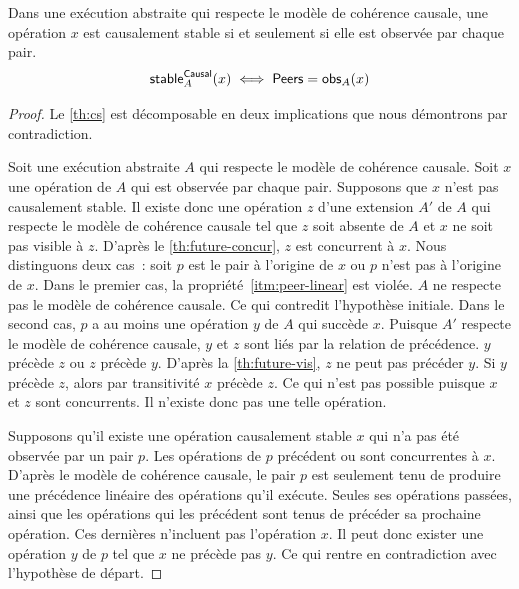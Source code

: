 \begin{theorem}\label{th:cs}
Dans une exécution abstraite qui respecte le modèle de cohérence causale, une opération $x$ est causalement stable si et seulement si elle est observée par chaque pair.
\begin{equation*}
    \operatorname{\mathsf{stable}}_A^{\operatorname{\mathsf{Causal}}}(x) \iff \operatorname{\mathsf{Peers}} = \operatorname{\mathsf{obs}}_A(x)
\end{equation*}
\end{theorem}

\begin{proof}
Le \autoref{th:cs} est décomposable en deux implications que nous démontrons par contradiction.

Soit une exécution abstraite $A$ qui respecte le modèle de cohérence causale.
Soit $x$ une opération de $A$ qui est observée par chaque pair.
Supposons que $x$ n'est pas causalement stable.
Il existe donc une opération $z$ d'une extension $A'$ de $A$ qui respecte le modèle de cohérence causale tel que $z$ soit absente de $A$ et $x$ ne soit pas visible à $z$.
D'après le \autoref{th:future-concur}, $z$ est concurrent à $x$.
Nous distinguons deux cas~: soit $p$ est le pair à l'origine de $x$ ou $p$ n'est pas à l'origine de $x$.
Dans le premier cas, la propriété~\ref{itm:peer-linear} est violée.
$A$ ne respecte pas le modèle de cohérence causale.
Ce qui contredit l'hypothèse initiale.
Dans le second cas, $p$ a au moins une opération $y$ de $A$ qui succède $x$.
Puisque $A'$ respecte le modèle de cohérence causale, $y$ et $z$ sont liés par la relation de précédence.
$y$ précède $z$ ou $z$ précède $y$.
D'après la \autoref{th:future-vis}, $z$ ne peut pas précéder $y$.
Si $y$ précède $z$, alors par transitivité $x$ précède $z$.
Ce qui n'est pas possible puisque $x$ et $z$ sont concurrents.
Il n'existe donc pas une telle opération.

Supposons qu'il existe une opération causalement stable $x$ qui n'a pas été observée par un pair $p$.
Les opérations de $p$ précédent ou sont concurrentes à $x$.
D'après le modèle de cohérence causale, le pair $p$ est seulement tenu de produire une précédence linéaire des opérations qu'il exécute.
Seules ses opérations passées, ainsi que les opérations qui les précédent sont tenus de précéder sa prochaine opération.
Ces dernières n'incluent pas l'opération $x$.
Il peut donc exister une opération $y$ de $p$ tel que $x$ ne précède pas $y$.
Ce qui rentre en contradiction avec l'hypothèse de départ.
\end{proof}


